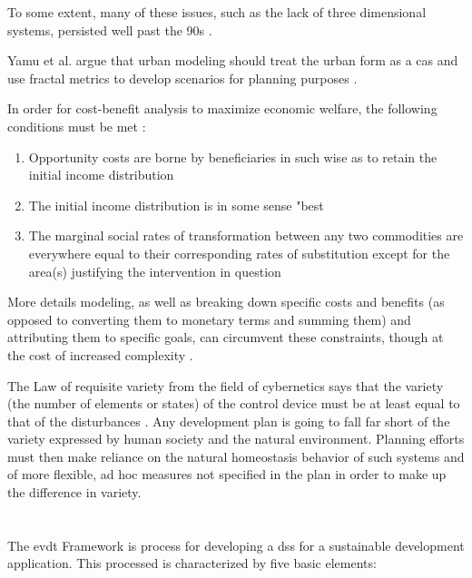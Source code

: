 To some extent, many of these issues, such as the lack of three dimensional systems, persisted well past the 90s \cite{goodchildTwentyYearsProgress2010}.

Yamu et al. argue that urban modeling should treat the urban form as a \ac{cas} and use fractal metrics to develop scenarios for planning purposes \cite{yamuAssumingItAll2016}.

In order for cost-benefit analysis to maximize economic welfare, the following conditions must be met \cite{krutillaWelfareAspectsBenefitCost1961}:

\begin{enumerate}[itemsep=0pt,parsep=0pt]
	\item{Opportunity costs are borne by beneficiaries in  such wise as to retain the initial income distribution}
	\item{The initial income distribution is in some sense "best}
	\item{The marginal social rates of transformation between any two commodities are everywhere equal to their corresponding rates of substitution except for the area(s) justifying the intervention in question}
\end{enumerate}

More details modeling, as well as breaking down specific costs and benefits (as opposed to converting them to monetary terms and summing them) and attributing them to specific goals, can circumvent these constraints, though at the cost of increased complexity \cite{hillGoalsAchievementMatrixEvaluating1972}.

The Law of requisite variety from the field of cybernetics says that the variety (the number of elements or states) of the control device must be at least equal to that of the disturbances \cite{ashbyRequisiteVarietyIts1991}. Any development plan is going to fall far short of the variety expressed by human society and the natural environment. Planning efforts must then make reliance on the natural homeostasis behavior of such systems and of more flexible, ad hoc measures not specified in the plan in order to make up the difference in variety. \cite{mcloughlinSystemGuidanceControl1972}

\section{} 

The \ac{evdt} Framework is process for developing a \ac{dss} for a sustainable development application. This processed is characterized by five basic elements: 

